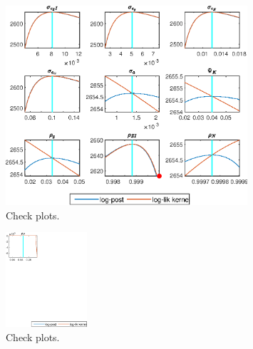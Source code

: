  
\begin{figure}[H]
\centering 
\includegraphics[width=0.80\textwidth]{BRS_growth_ext_fd/graphs/BRS_growth_ext_fd_CheckPlots1}
\caption{Check plots.}\label{Fig:CheckPlots:1}
\end{figure}
 
\begin{figure}[H]
\centering 
\includegraphics[width=0.27\textwidth]{BRS_growth_ext_fd/graphs/BRS_growth_ext_fd_CheckPlots2}
\caption{Check plots.}\label{Fig:CheckPlots:2}
\end{figure}
 
